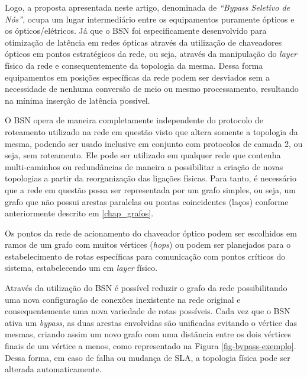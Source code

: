 Logo, a proposta apresentada neste artigo, denominada de  \emph{``Bypass Seletivo de Nós''}, ocupa um lugar intermediário entre os equipamentos puramente ópticos e os ópticos/elétricos. Já que o BSN foi especificamente desenvolvido para otimização de latência em redes ópticas através da utilização de chaveadores ópticos em pontos estratégicos da rede, ou seja, através da manipulação do \emph{layer} físico da rede e consequentemente da topologia da mesma. Dessa forma equipamentos em posições específicas da rede podem ser desviados sem a necessidade de nenhuma conversão de meio ou mesmo processamento, resultando na mínima inserção de latência possível. 

O BSN opera de maneira completamente independente do protocolo de roteamento utilizado na rede em questão visto que altera somente a topologia da mesma, podendo ser usado inclusive em conjunto com protocolos de camada 2, ou seja, sem roteamento. Ele pode ser utilizado em qualquer rede que contenha multi-caminhos ou redundâncias de maneira a possibilitar a criação de novas topologias a partir da reorganização das ligações físicas. Para tanto, é necessário que a rede em questão possa ser representada por um grafo simples, ou seja, um grafo que não possui arestas paralelas ou pontas coincidentes (laços) conforme anteriormente descrito em \ref{chap_grafos}.

Os pontos da rede de acionamento do chaveador óptico podem ser escolhidos em ramos de um grafo com muitos vértices (\emph{hops}) ou podem ser planejados para o estabelecimento de rotas específicas para comunicação com pontos críticos do sistema, estabelecendo um  em \emph{layer} físico.

Através da utilização do BSN é possível reduzir o grafo da rede possibilitando uma nova configuração de conexões inexistente na rede original e consequentemente uma nova variedade de rotas possíveis. Cada vez que o BSN ativa um \emph{bypass}, as duas arestas envolvidas são unificadas evitando o vértice das mesmas, criando assim um novo grafo com uma distância entre os dois vértices finais de um vértice a menos, como representado na Figura \ref{fig-bypass-exemplo}. Dessa forma, em caso de falha ou mudança de SLA, a topologia física pode ser alterada automaticamente.

